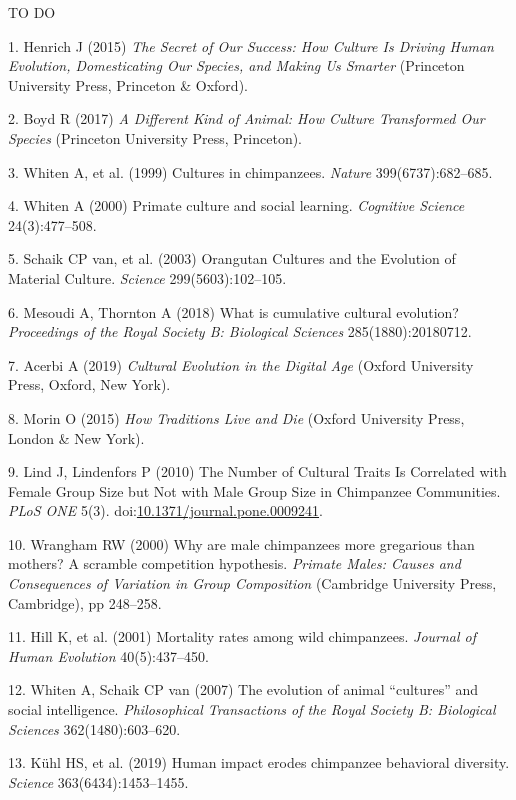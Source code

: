 \documentclass[9pt,twocolumn,twoside,]{pnas-new}
\begin{document}
TO DO

\showmatmethods
\showacknow
\pnasbreak

\hypertarget{refs}{}
\hypertarget{ref-henrich_secret_2015}{}
1. Henrich J (2015) \emph{The Secret of Our Success: How Culture Is
Driving Human Evolution, Domesticating Our Species, and Making Us
Smarter} (Princeton University Press, Princeton \& Oxford).

\hypertarget{ref-boyd_different_2017}{}
2. Boyd R (2017) \emph{A Different Kind of Animal: How Culture
Transformed Our Species} (Princeton University Press, Princeton).

\hypertarget{ref-whiten_cultures_1999}{}
3. Whiten A, et al. (1999) Cultures in chimpanzees. \emph{Nature}
399(6737):682--685.

\hypertarget{ref-whiten_primate_2000}{}
4. Whiten A (2000) Primate culture and social learning. \emph{Cognitive
Science} 24(3):477--508.

\hypertarget{ref-van_schaik_orangutan_2003}{}
5. Schaik CP van, et al. (2003) Orangutan Cultures and the Evolution of
Material Culture. \emph{Science} 299(5603):102--105.

\hypertarget{ref-mesoudi_what_2018}{}
6. Mesoudi A, Thornton A (2018) What is cumulative cultural evolution?
\emph{Proceedings of the Royal Society B: Biological Sciences}
285(1880):20180712.

\hypertarget{ref-acerbi_cultural_2019}{}
7. Acerbi A (2019) \emph{Cultural Evolution in the Digital Age} (Oxford
University Press, Oxford, New York).

\hypertarget{ref-morin_how_2015}{}
8. Morin O (2015) \emph{How Traditions Live and Die} (Oxford University
Press, London \& New York).

\hypertarget{ref-lind_number_2010}{}
9. Lind J, Lindenfors P (2010) The Number of Cultural Traits Is
Correlated with Female Group Size but Not with Male Group Size in
Chimpanzee Communities. \emph{PLoS ONE} 5(3).
doi:\href{https://doi.org/10.1371/journal.pone.0009241}{10.1371/journal.pone.0009241}.

\hypertarget{ref-wrangham_why_2000}{}
10. Wrangham RW (2000) Why are male chimpanzees more gregarious than
mothers? A scramble competition hypothesis. \emph{Primate Males: Causes
and Consequences of Variation in Group Composition} (Cambridge
University Press, Cambridge), pp 248--258.

\hypertarget{ref-hill_mortality_2001}{}
11. Hill K, et al. (2001) Mortality rates among wild chimpanzees.
\emph{Journal of Human Evolution} 40(5):437--450.

\hypertarget{ref-whiten_evolution_2007}{}
12. Whiten A, Schaik CP van (2007) The evolution of animal ``cultures''
and social intelligence. \emph{Philosophical Transactions of the Royal
Society B: Biological Sciences} 362(1480):603--620.

\hypertarget{ref-kuhl_human_2019}{}
13. Kühl HS, et al. (2019) Human impact erodes chimpanzee behavioral
diversity. \emph{Science} 363(6434):1453--1455.



% 
\end{document}
